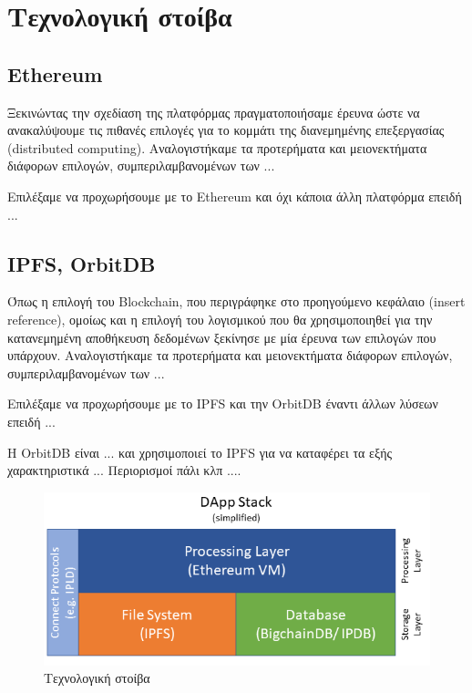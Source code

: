 \section{Τεχνολογική στοίβα} \label{section:3-2-technology-stack}


\subsection{Ethereum}

Ξεκινώντας την σχεδίαση της πλατφόρμας πραγματοποιήσαμε έρευνα ώστε να ανακαλύψουμε τις πιθανές επιλογές για το κομμάτι της διανεμημένης επεξεργασίας (\textenglish{distributed computing}). Αναλογιστήκαμε τα προτερήματα και μειονεκτήματα διάφορων επιλογών, συμπεριλαμβανομένων των ... 

Επιλέξαμε να προχωρήσουμε με το Ethereum και όχι κάποια άλλη πλατφόρμα επειδή ...


\subsection{IPFS, OrbitDB}

Όπως η επιλογή του Blockchain, που περιγράφηκε στο προηγούμενο κεφάλαιο (\textenglish{insert reference}), ομοίως και η επιλογή του λογισμικού που θα χρησιμοποιηθεί για την κατανεμημένη αποθήκευση δεδομένων ξεκίνησε με μία έρευνα των επιλογών που υπάρχουν. Αναλογιστήκαμε τα προτερήματα και μειονεκτήματα διάφορων επιλογών, συμπεριλαμβανομένων των ... 

Επιλέξαμε να προχωρήσουμε με το IPFS και την OrbitDB έναντι άλλων λύσεων επειδή ...

Η OrbitDB είναι ... και χρησιμοποιεί το IPFS για να καταφέρει τα εξής χαρακτηριστικά ...
Περιορισμοί πάλι κλπ ....

\begin{figure}[H]
    \centering
    \includegraphics[width=.75\textwidth]{assets/figures/chapter-3/simple_dapp_stack}
    \caption{Τεχνολογική στοίβα}
\end{figure}
